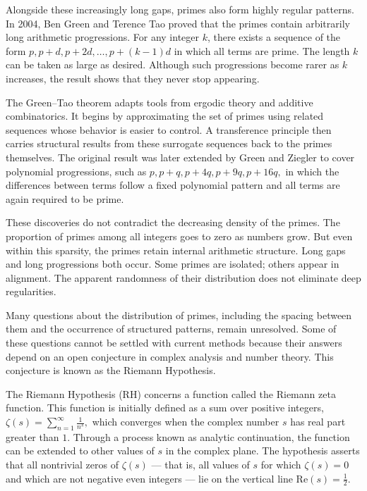 Alongside these increasingly long gaps, primes also form highly regular patterns. In 2004, Ben Green and Terence Tao proved that the primes contain arbitrarily long arithmetic progressions. For any integer $k$, there exists a sequence of the form $p,  p + d,  p + 2d,  \dots,  p + (k - 1)d$ in which all terms are prime. The length $k$ can be taken as large as desired. Although such progressions become rarer as $k$ increases, the result shows that they never stop appearing.

The Green–Tao theorem adapts tools from ergodic theory and additive combinatorics. It begins by approximating the set of primes using related sequences whose behavior is easier to control. A transference principle then carries structural results from these surrogate sequences back to the primes themselves. The original result was later extended by Green and Ziegler to cover polynomial progressions, such as $p,  p + q,  p + 4q,  p + 9q,  p + 16q, $ in which the differences between terms follow a fixed polynomial pattern and all terms are again required to be prime.

These discoveries do not contradict the decreasing density of the primes. The proportion of primes among all integers goes to zero as numbers grow. But even within this sparsity, the primes retain internal arithmetic structure. Long gaps and long progressions both occur. Some primes are isolated; others appear in alignment. The apparent randomness of their distribution does not eliminate deep regularities.

Many questions about the distribution of primes, including the spacing between them and the occurrence of structured patterns, remain unresolved. Some of these questions cannot be settled with current methods because their answers depend on an open conjecture in complex analysis and number theory. This conjecture is known as the Riemann Hypothesis.

The Riemann Hypothesis (RH) concerns a function called the Riemann zeta function. This function is initially defined as a sum over positive integers, $\zeta(s) = \sum_{n=1}^\infty \frac{1}{n^s},$
which converges when the complex number $s$ has real part greater than $1$. Through a process known as analytic continuation, the function can be extended to other values of $s$ in the complex plane. The hypothesis asserts that all nontrivial zeros of $\zeta(s)$ — that is, all values of $s$ for which $\zeta(s) = 0$ and which are not negative even integers — lie on the vertical line $\mathrm{Re}(s) = \tfrac{1}{2}$.

